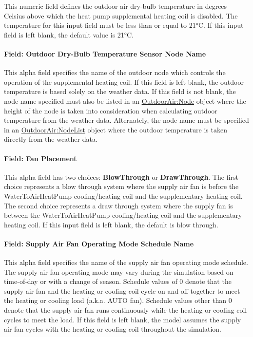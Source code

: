 This numeric field defines the outdoor air dry-bulb temperature in degrees Celsius above which the heat pump supplemental heating coil is disabled. The temperature for this input field must be less than or equal to 21°C. If this input field is left blank, the default value is 21°C.

\paragraph{Field: Outdoor Dry-Bulb Temperature Sensor Node Name}\label{field-outdoor-dry-bulb-temperature-sensor-node-name-000}

This alpha field specifies the name of the outdoor node which controls the operation of the supplemental heating coil. If this field is left blank, the outdoor temperature is based solely on the weather data. If this field is not blank, the node name specified must also be listed in an \hyperref[outdoorairnode]{OutdoorAir:Node} object where the height of the node is taken into consideration when calculating outdoor temperature from the weather data. Alternately, the node name must be specified in an \hyperref[outdoorairnodelist]{OutdoorAir:NodeList} object where the outdoor temperature is taken directly from the weather data.

\paragraph{Field: Fan Placement}\label{field-fan-placement-5-000}

This alpha field has two choices: \textbf{BlowThrough} or \textbf{DrawThrough}. The first choice represents a blow through system where the supply air fan is before the WaterToAirHeatPump cooling/heating coil and the supplementary heating coil. The second choice represents a draw through system where the supply fan is between the WaterToAirHeatPump cooling/heating coil and the supplementary heating coil. If this input field is left blank, the default is blow through.

\paragraph{Field: Supply Air Fan Operating Mode Schedule Name}\label{field-supply-air-fan-operating-mode-schedule-name-6}

This alpha field specifies the name of the supply air fan operating mode schedule. The supply air fan operating mode may vary during the simulation based on time-of-day or with a change of season. Schedule values of 0 denote that the supply air fan and the heating or cooling coil cycle on and off together to meet the heating or cooling load (a.k.a. AUTO fan). Schedule values other than 0 denote that the supply air fan runs continuously while the heating or cooling coil cycles to meet the load. If this field is left blank, the model assumes the supply air fan cycles with the heating or cooling coil throughout the simulation.


